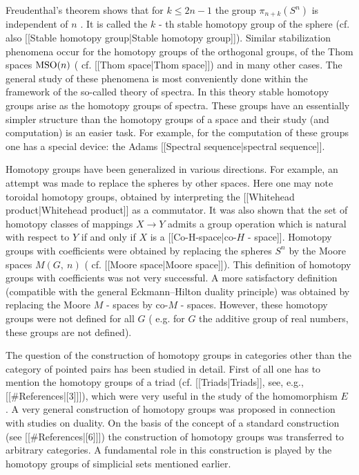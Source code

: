 Freudenthal's theorem shows that for $  k \leq 2n - 1 $ 
the group $  \pi _{n+k} (S ^{n} ) $ 
is independent of $  n $ . 
It is called the $  k $ -
th stable homotopy group of the sphere (cf. also [[Stable homotopy group|Stable homotopy group]]). Similar stabilization phenomena occur for the homotopy groups of the orthogonal groups, of the Thom spaces $   \mathop{\rm MSO}\nolimits (n) $ (
cf. [[Thom space|Thom space]]) and in many other cases. The general study of these phenomena is most conveniently done within the framework of the so-called theory of spectra. In this theory stable homotopy groups arise as the homotopy groups of spectra. These groups have an essentially simpler structure than the homotopy groups of a space and their study (and computation) is an easier task. For example, for the computation of these groups one has a special device: the Adams [[Spectral sequence|spectral sequence]].

Homotopy groups have been generalized in various directions. For example, an attempt was made to replace the spheres by other spaces. Here one may note toroidal homotopy groups, obtained by interpreting the [[Whitehead product|Whitehead product]] as a commutator. It was also shown that the set of homotopy classes of mappings $  X \rightarrow Y $ 
admits a group operation which is natural with respect to $  Y $ 
if and only if $  X $ 
is a [[Co-H-space|co-$  H $ -
space]]. Homotopy groups with coefficients were obtained by replacing the spheres $  S ^{n} $ 
by the Moore spaces $  M (G,\  n) $ (
cf. [[Moore space|Moore space]]). This definition of homotopy groups with coefficients was not very successful. A more satisfactory definition (compatible with the general Eckmann–Hilton duality principle) was obtained by replacing the Moore $  M $ -
spaces by co-$  M $ -
spaces. However, these homotopy groups were not defined for all $  G $ (
e.g. for $  G $ 
the additive group of real numbers, these groups are not defined).

The question of the construction of homotopy groups in categories other than the category of pointed pairs has been studied in detail. First of all one has to mention the homotopy groups of a triad (cf. [[Triads|Triads]], see, e.g., [[#References|[3]]]), which were very useful in the study of the homomorphism $  E $ . 
A very general construction of homotopy groups was proposed in connection with studies on duality. On the basis of the concept of a standard construction (see [[#References|[6]]]) the construction of homotopy groups was transferred to arbitrary categories. A fundamental role in this construction is played by the homotopy groups of simplicial sets mentioned earlier.








